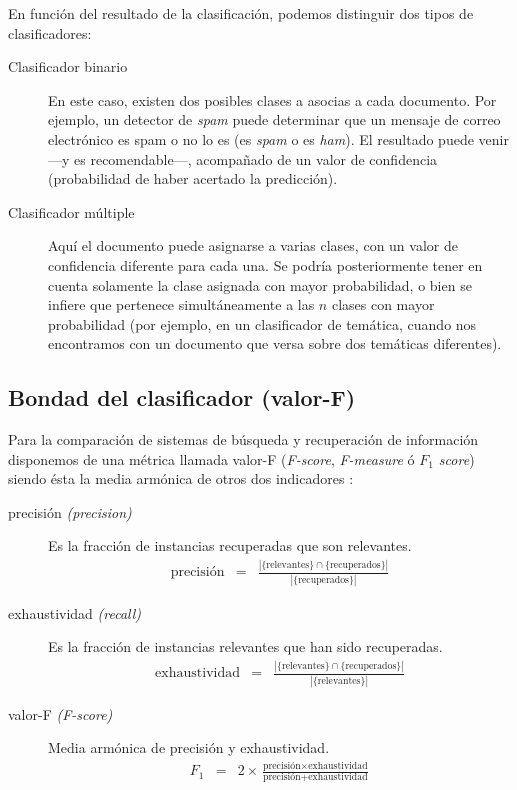 En función del resultado de la clasificación, podemos distinguir dos tipos de clasificadores:
\nopagebreak
\begin{description}
\item[Clasificador binario] En este caso, existen dos posibles clases a asocias a cada documento. Por ejemplo, un detector de \emph{spam} puede determinar que un mensaje de correo electrónico es spam o no lo es (es \emph{spam} o es \emph{ham}). El resultado puede venir ---y es recomendable---, acompañado de un valor de confidencia (probabilidad de haber acertado la predicción).
\item[Clasificador múltiple] Aquí el documento puede asignarse a varias clases, con un valor de confidencia diferente para cada una. Se podría posteriormente tener en cuenta solamente la clase asignada con mayor probabilidad, o bien se infiere que pertenece simultáneamente a las $n$ clases con mayor probabilidad (por ejemplo, en un clasificador de temática, cuando nos encontramos con un documento que versa sobre dos temáticas diferentes).
\end{description}

\FloatBarrier
\subsection{Bondad del clasificador (valor-F)}

Para la comparación de sistemas de búsqueda y recuperación de información disponemos de una métrica llamada valor-F (\emph{F-score}, \emph{F-measure} ó \emph{$F_1$ score}) siendo ésta la media armónica de otros dos indicadores \citep[Precisión y exhaustividad]{wikipedia-es}:
\begin{description}
\item[precisión \emph{(precision)}] 
Es la fracción de instancias recuperadas que son relevantes.
\begin{eqnarray}
\text{precisión} &=& \frac{|\{\text{relevantes}\}\cap\{\text{recuperados}\}|}{|\{\text{recuperados}\}|}
\end{eqnarray}
\item[exhaustividad \emph{(recall)}] 
Es la fracción de instancias relevantes que han sido recuperadas.
\begin{eqnarray}
\text{exhaustividad} &=& \frac{|\{\text{relevantes}\}\cap\{\text{recuperados}\}|}{|\{\text{relevantes}\}|}
\end{eqnarray}
\item[valor-F \emph{(F-score)}] Media armónica de precisión y exhaustividad.
\begin{eqnarray}
F_1 &=& 2\times\frac{\text{precisión}\times\text{exhaustividad}}{\text{precisión}+\text{exhaustividad}}
\end{eqnarray}
\end{description}

